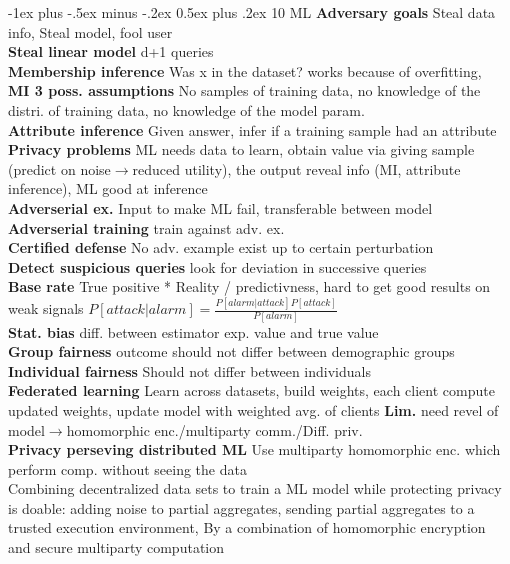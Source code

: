 \documentclass[10pt,landscape]{article}
\makeatletter
\renewcommand{\section}{\@startsection{section}{1}{0mm}%
                                {-1ex plus -.5ex minus -.2ex}%
                                {0.5ex plus .2ex}%
                                {\normalfont\large\bfseries}}
\makeatother
\begin{document}
\begin{multicols*}{4}
\section{10 ML}
\textbf{Adversary goals} Steal data info, Steal model, fool user\\
\textbf{Steal linear model} d+1 queries\\
\textbf{Membership inference} Was x in the dataset? works because of overfitting,\\
\textbf{MI 3 poss. assumptions} No samples of training data, no knowledge of the distri. of training data, no knowledge of the model param.\\
\textbf{Attribute inference} Given answer, infer if a training sample had an attribute\\
\textbf{Privacy problems} ML needs data to learn, obtain value via giving sample (predict on noise$\rightarrow$reduced utility), the output reveal info (MI, attribute inference), ML good at inference\\ 
\textbf{Adverserial ex.} Input to make ML fail, transferable between model\\
\textbf{Adverserial training} train against adv. ex.\\
\textbf{Certified defense} No adv. example exist up to certain perturbation\\
\textbf{Detect suspicious queries} look for deviation in successive queries\\
\textbf{Base rate} True positive * Reality / predictivness, hard to get good results on weak signals $P[attack|alarm]=\frac{P[alarm|attack]P[attack]}{P[alarm]}$\\
\textbf{Stat. bias} diff. between estimator exp. value and true value\\
\textbf{Group fairness} outcome should not differ between demographic groups\\
\textbf{Individual fairness} Should not differ between individuals\\
\textbf{Federated learning} Learn across datasets, build weights, each client compute updated weights, update model with weighted avg. of clients
\textbf{Lim.} need revel of model$\rightarrow$homomorphic enc./multiparty comm./Diff. priv.\\
\textbf{Privacy perseving distributed ML} Use multiparty homomorphic enc. which perform comp. without seeing the data\\
\textbf{}Combining decentralized data sets to train a ML model while protecting privacy is doable: adding noise to partial aggregates, sending partial aggregates to a trusted execution environment, By a combination of homomorphic encryption and secure multiparty computation\\


\end{multicols*}
\end{document}
